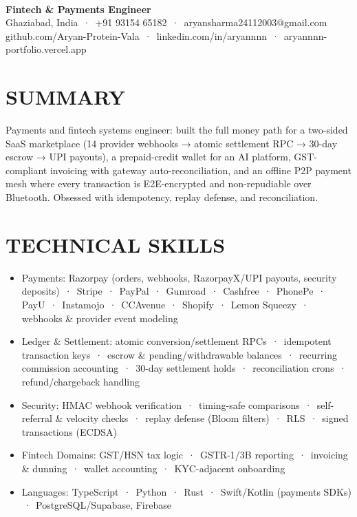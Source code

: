 \documentclass[9pt]{article}
\begin{document}
\\[3pt]
{\large\bfseries Fintech \& Payments Engineer}\\[3pt]
{\small\color{greyc} Ghaziabad, India \,·\, +91 93154 65182 \,·\, aryansharma24112003@gmail.com}\vspace{-2pt}
{\small\color{greyc} github.com/Aryan-Protein-Vala \,·\, linkedin.com/in/aryannnn \,·\, aryannnn-portfolio.vercel.app}\vspace{-2pt}
\section*{SUMMARY}
Payments and fintech systems engineer: built the full money path for a two-sided SaaS marketplace (14 provider webhooks → atomic settlement RPC → 30-day escrow → UPI payouts), a prepaid-credit wallet for an AI platform, GST-compliant invoicing with gateway auto-reconciliation, and an offline P2P payment mesh where every transaction is E2E-encrypted and non-repudiable over Bluetooth. Obsessed with idempotency, replay defense, and reconciliation.
\vspace{1pt}
\section*{TECHNICAL SKILLS}
\begin{itemize}[leftmargin=11pt,itemsep=0pt,topsep=1pt,parsep=0pt]
\item Payments: Razorpay (orders, webhooks, RazorpayX/UPI payouts, security deposits) \,·\, Stripe \,·\, PayPal \,·\, Gumroad \,·\, Cashfree \,·\, PhonePe \,·\, PayU \,·\, Instamojo \,·\, CCAvenue \,·\, Shopify \,·\, Lemon Squeezy \,·\, webhooks \& provider event modeling
\item Ledger \& Settlement: atomic conversion/settlement RPCs \,·\, idempotent transaction keys \,·\, escrow \& pending/withdrawable balances \,·\, recurring commission accounting \,·\, 30-day settlement holds \,·\, reconciliation crons \,·\, refund/chargeback handling
\item Security: HMAC webhook verification \,·\, timing-safe comparisons \,·\, self-referral \& velocity checks \,·\, replay defense (Bloom filters) \,·\, RLS \,·\, signed transactions (ECDSA)
\item Fintech Domains: GST/HSN tax logic \,·\, GSTR-1/3B reporting \,·\, invoicing \& dunning \,·\, wallet accounting \,·\, KYC-adjacent onboarding
\item Languages: TypeScript \,·\, Python \,·\, Rust \,·\, Swift/Kotlin (payments SDKs) \,·\, PostgreSQL/Supabase, Firebase
\end{itemize}
\end{document}
